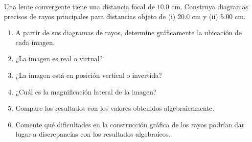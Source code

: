 \item Una lente convergente tiene una distancia focal de $10.0\text{ cm}$. Construya diagramas precisos de rayos principales para distancias objeto de (i) $20.0\text{ cm}$ y (ii) $5.00\text{ cm}$.
\begin{enumerate}
    \item A partir de sus diagramas de rayos, determine gráficamente la ubicación de cada imagen.
    \item ¿La imagen es real o virtual?
    \item ¿La imagen está en posición vertical o invertida?
    \item ¿Cuál es la magnificación lateral de la imagen?
    \item Compare los resultados con los valores obtenidos algebraicamente.
    \item Comente qué dificultades en la construcción gráfica de los rayos podrían dar lugar a discrepancias con los resultados algebraicos.
\end{enumerate}